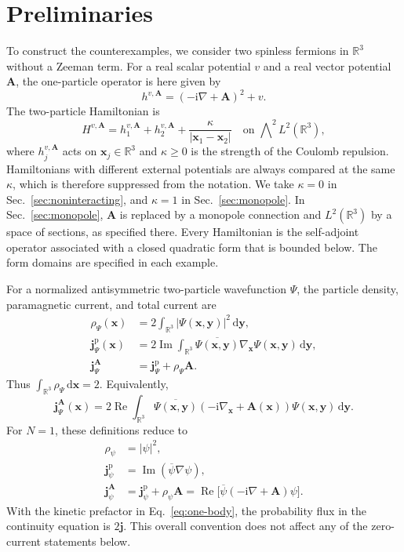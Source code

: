 \documentclass[11pt,a4paper]{article}
\theoremstyle{remark}
\theoremstyle{plain}
\newcommand{\R}{\mathbb R}
\newcommand{\jp}{\mathbf j^{\mathrm p}}
\newcommand{\jj}{\mathbf j}
\newcommand{\A}{\mathbf A}
\begin{document}
\section{Preliminaries}
\label{sec:preliminaries}

To construct the counterexamples, we consider two spinless fermions
in $\R^3$ without a Zeeman term.
For a real scalar potential $v$ and a real vector potential $\A$, the
one-particle operator is here given by
\begin{equation}
 h^{v,\A}=(-\mathrm{i}\nabla+\A)^2+v.
 \label{eq:one-body}
\end{equation}
The two-particle Hamiltonian is
\begin{equation}
 H^{v,\A}=h^{v,\A}_1+h^{v,\A}_2
 +\frac{\kappa}{|\mathbf x_1-\mathbf x_2|}
 \quad\text{on }\bigwedge\nolimits^2 L^2(\R^3),
 \label{eq:Hamiltonian}
\end{equation}
where $h^{v,\A}_j$ acts on $\mathbf x_j \in \R^3$ and $\kappa\ge0$ is the
strength of the Coulomb repulsion. Hamiltonians with different
external potentials are always compared at the same $\kappa$, which
is therefore suppressed from the notation. We take $\kappa=0$ in
Sec.~\ref{sec:noninteracting}, and $\kappa=1$ in
Sec.~\ref{sec:monopole}. In Sec.~\ref{sec:monopole}, $\A$ is replaced
by a monopole connection and $L^2(\R^3)$ by a space of sections, as
specified there. Every Hamiltonian is the self-adjoint operator
associated with a closed quadratic form that is bounded below. The
form domains are specified in each example.

For a normalized antisymmetric two-particle wavefunction $\Psi$,
the particle density, paramagnetic current, and total current are
\begin{align*}
 \rho_\Psi(\mathbf x)
 &=2\int_{\R^3}|\Psi(\mathbf x,\mathbf y)|^2\,\mathrm{d}\mathbf y,\\
 \jp_\Psi(\mathbf x)
 &=2\operatorname{Im}\int_{\R^3}
 \overline{\Psi(\mathbf x,\mathbf y)}
 \nabla_{\mathbf x}\Psi(\mathbf x,\mathbf y)\,\mathrm{d}\mathbf y,\\
 \jj_{\Psi}^{\A}&=\jp_\Psi+\rho_\Psi\A.
\end{align*}
Thus $\int_{\R^3}\rho_\Psi\,\mathrm{d}\mathbf x=2$. Equivalently,
\begin{equation}
 \jj_{\Psi}^{\A}(\mathbf x)=2\operatorname{Re}\int_{\R^3}
 \overline{\Psi(\mathbf x,\mathbf y)}
 (-\mathrm{i}\nabla_{\mathbf x}+\A(\mathbf x))\Psi(\mathbf x,\mathbf y)
 \,\mathrm{d}\mathbf y.
 \label{eq:current}
\end{equation}
For $N=1$, these definitions reduce to
\begin{align*}
 \rho_\psi&=|\psi|^2,\\
 \jp_\psi&=\operatorname{Im}(\overline\psi\nabla\psi),\\
 \jj_\psi^{\A}&=\jp_\psi+\rho_\psi\A
 =\operatorname{Re}\bigl[\overline\psi(-\mathrm{i}\nabla+\A)\psi\bigr].
\end{align*}
With the kinetic prefactor in Eq.~\eqref{eq:one-body}, the probability
flux in the continuity equation is $2\jj$. This overall convention
does not affect any of the zero-current statements below.
\end{document}
